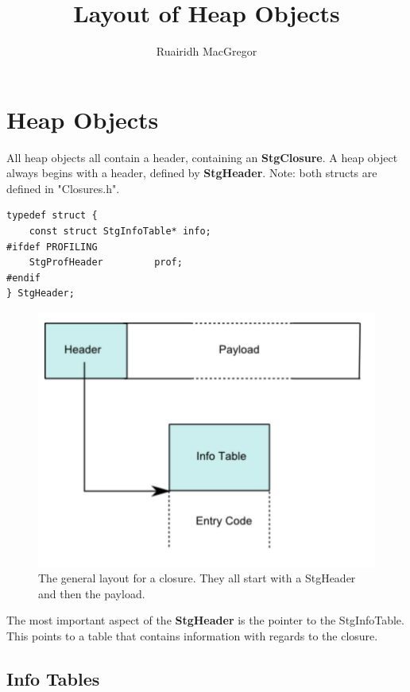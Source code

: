 \documentclass[a4paper,11pt]{article}
\title{Layout of Heap Objects}
\author{Ruairidh MacGregor}
\date{}
\begin{document}
\maketitle

\section{Heap Objects}

All heap objects all contain a header, containing an \textbf{StgClosure}. A heap object always begins with a header, defined by \textbf{StgHeader}. Note: both structs are defined in "Closures.h".

\begin{lstlisting}[style=CStyle]
typedef struct {
    const struct StgInfoTable* info;
#ifdef PROFILING
    StgProfHeader         prof;
#endif
} StgHeader;
\end{lstlisting}

\begin{figure}[H]
    \centering
    \includegraphics[width=\linewidth,height=0.7\linewidth]{GHC RTS Notes/Storage/images/header.png}
    \caption{The general layout for a closure. They all start with a StgHeader and then the payload.}
    \label{fig:header}
\end{figure}

The most important aspect of the \textbf{StgHeader} is the pointer to the StgInfoTable. This points to a table that contains information with regards to the closure.

\subsection{Info Tables}
\end{document}
